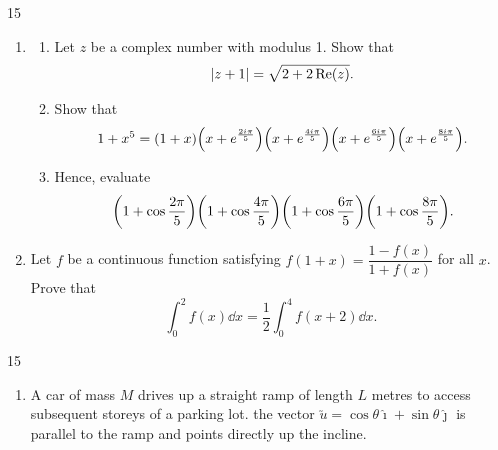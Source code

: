 \documentclass[12pt]{extarticle}
\begin{document}
\begin{shortanswer}
\begin{bookletquestion}{15}
\begin{enumerate}
			\item
			      \begin{enumerate}
				      \item {} Let $z$ be a complex number with modulus 1.
				            Show that
				            \[\abs{z+1}=\sqrt{2+2\Re(z)}.\]
				      \item {} Show that
				            \[1+x^5=(1+x)\qty(x+e^{\frac{2i\pi}{5}})\qty(x+e^{\frac{4i\pi}{5}})\qty(x+e^{\frac{6i\pi}{5}})\qty(x+e^{\frac{8i\pi}{5}}).\]
				      \item {} Hence, evaluate
				            \[\qty(1+\cos\dfrac{2\pi}{5})\qty(1+\cos\dfrac{4\pi}{5})\qty(1+\cos\dfrac{6\pi}{5})\qty(1+\cos\dfrac{8\pi}{5}).\]
			      \end{enumerate}

			\item {} Let $f$ be a continuous function satisfying $f(1+x)=\dfrac{1-f(x)}{1+f(x)}$ for all $x$.
			      Prove that
			      \[\int_0^2f(x)\dd{x}=\dfrac{1}{2}\int_0^4f(x+2)\dd{x}.\]
		\end{enumerate}
	\end{bookletquestion}
	\pagebreak
	\begin{bookletquestion}{15}
		\begin{enumerate}
			\item A car of mass $M$ drives up a straight ramp of length $L$ metres to access subsequent storeys of a parking lot.
			      the vector $\utilde{u}=\cos\theta\hat{\imath}+\sin\theta\hat{\jmath}$ is parallel to the ramp and points directly up the incline.


\end{enumerate}
\end{bookletquestion}
\end{shortanswer}
\end{document}
